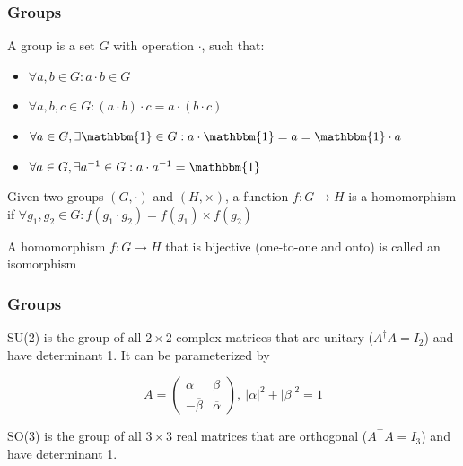 \documentclass{beamer}
\begin{document}
\begin{frame}
\frametitle{Groups}
\begin{definition}[Groups]
A group is a set $G$ with operation $\cdot$, such that:

\begin{itemize}
	\item $\forall a, b \in G: a \cdot b \in G$
	\item $\forall a, b, c \in G: (a \cdot b) \cdot c = a \cdot (b \cdot c)$
	\item $\forall a \in G, \exists \mathbbm{1} \in G: a \cdot \mathbbm{1} = a = \mathbbm{1} \cdot a$
	\item $\forall a \in G, \exists a^{-1} \in G: a \cdot a^{-1} = \mathbbm{1}$
\end{itemize}
\end{definition}

\begin{definition}
Given two groups $(G, \cdot)$ and $(H, \times)$, a function $f: G \to H$ is a homomorphism if $\forall g_1, g_2 \in G: f(g_1 \cdot g_2) = f(g_1) \times f(g_2)$
\end{definition}

\begin{definition}
	A homomorphism $f: G \to H$ that is bijective (one-to-one and onto) is called an isomorphism
\end{definition}

\end{frame}

\begin{frame}
\frametitle{Groups}
\begin{definition}
SU(2) is the group of all $2 \times 2$ complex matrices that are unitary ($A^\dagger A = I_2$) and have determinant 1. It can be parameterized by

$$
A = 
\begin{pmatrix}
      \alpha       & \beta \\
		- \overline{\beta}       & \overline{\alpha}
\end{pmatrix} ,\ |\alpha| ^ 2 + |\beta| ^ 2 = 1
$$
\end{definition}

\begin{definition}
SO(3) is the group of all $3 \times 3$ real matrices that are orthogonal ($A^\top A = I_3$) and have determinant 1.
\end{definition}
\end{frame}
\end{document}
